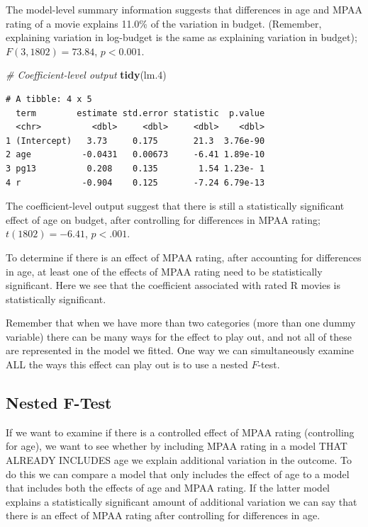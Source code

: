 \documentclass[]{book}
\newenvironment{Shaded}{\begin{snugshade}}{\end{snugshade}}
\newcommand{\CommentTok}[1]{\textcolor[rgb]{0.56,0.35,0.01}{\textit{#1}}}
\newcommand{\FloatTok}[1]{\textcolor[rgb]{0.00,0.00,0.81}{#1}}
\newcommand{\KeywordTok}[1]{\textcolor[rgb]{0.13,0.29,0.53}{\textbf{#1}}}
\newcommand{\NormalTok}[1]{#1}
\begin{document}
The model-level summary information suggests that differences in age and MPAA rating of a movie explains 11.0\% of the variation in budget. (Remember, explaining variation in log-budget is the same as explaining variation in budget); \(F(3,1802)=73.84\), \(p<0.001\).

\begin{Shaded}
\begin{Highlighting}[]
\CommentTok{# Coefficient-level output}
\KeywordTok{tidy}\NormalTok{(lm}\FloatTok{.4}\NormalTok{)}
\end{Highlighting}
\end{Shaded}

\begin{verbatim}
# A tibble: 4 x 5
  term        estimate std.error statistic  p.value
  <chr>          <dbl>     <dbl>     <dbl>    <dbl>
1 (Intercept)   3.73     0.175       21.3  3.76e-90
2 age          -0.0431   0.00673     -6.41 1.89e-10
3 pg13          0.208    0.135        1.54 1.23e- 1
4 r            -0.904    0.125       -7.24 6.79e-13
\end{verbatim}

The coefficient-level output suggest that there is still a statistically significant effect of age on budget, after controlling for differences in MPAA rating; \(t(1802)=-6.41\), \(p<.001\).

To determine if there is an effect of MPAA rating, after accounting for differences in age, at least one of the effects of MPAA rating need to be statistically significant. Here we see that the coefficient associated with rated R movies is statistically significant.

Remember that when we have more than two categories (more than one dummy variable) there can be many ways for the effect to play out, and not all of these are represented in the model we fitted. One way we can simultaneously examine ALL the ways this effect can play out is to use a nested \(F\)-test.

\hypertarget{nested-f-test}{%
\subsection{Nested F-Test}\label{nested-f-test}}

If we want to examine if there is a controlled effect of MPAA rating (controlling for age), we want to see whether by including MPAA rating in a model THAT ALREADY INCLUDES age we explain additional variation in the outcome. To do this we can compare a model that only includes the effect of age to a model that includes both the effects of age and MPAA rating. If the latter model explains a statistically significant amount of additional variation we can say that there is an effect of MPAA rating after controlling for differences in age.
\end{document}
